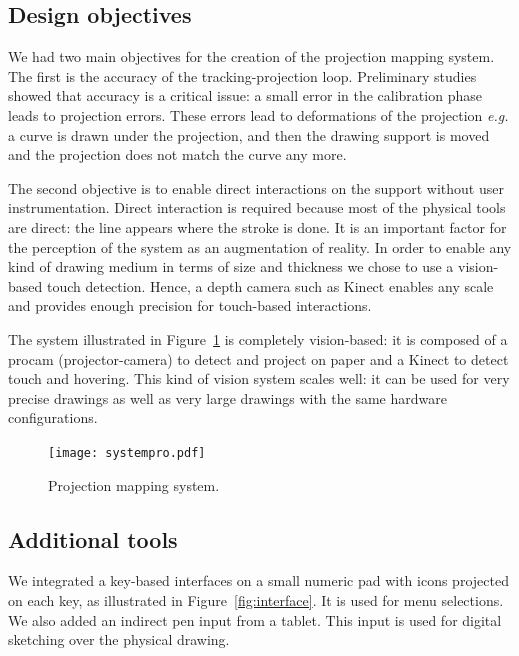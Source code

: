 \documentclass{sigchi}
\begin{document}
\subsection{Design objectives}

We had two main objectives for the creation of the projection mapping system. The
first is the accuracy of the tracking-projection loop. Preliminary
studies showed that accuracy is a critical issue: a small error in
the calibration phase leads to projection errors. These errors lead to
deformations of the projection \textit{e.g.} a curve is drawn under
the projection, and then the drawing support is moved and the
projection does not match the curve any more.

The second objective is to enable direct interactions on the support 
without user instrumentation. Direct interaction is required because
most of the physical tools are direct: the line appears where the stroke
is done. It is an important factor for the perception of the system as
an augmentation of reality. 
In order to enable any kind of drawing medium in
terms of size and thickness we chose to use a vision-based touch
detection. Hence, a depth camera such as Kinect enables any scale and
provides enough precision for touch-based interactions. 

The system illustrated in Figure~\ref{fig:system} is completely
vision-based: it is composed of a procam (projector-camera) to detect
and project on paper and a Kinect to detect touch and hovering.
This kind of vision system scales well: it can be used for very precise
drawings as well as very large drawings with the same hardware
configurations. 

\begin{figure}[t!]
\centering
\texttt{[image: systempro.pdf]}
\caption{Projection mapping system.}
\label{fig:system}
\end{figure}



\subsection{Additional tools}


We integrated a
key-based interfaces on a small numeric pad with icons projected on
each key, as illustrated in Figure~\ref{fig:interface}. It is used for
menu selections. 
We also added an indirect pen input from a
 tablet. This input is used
for digital sketching over the physical drawing.
\end{document}
